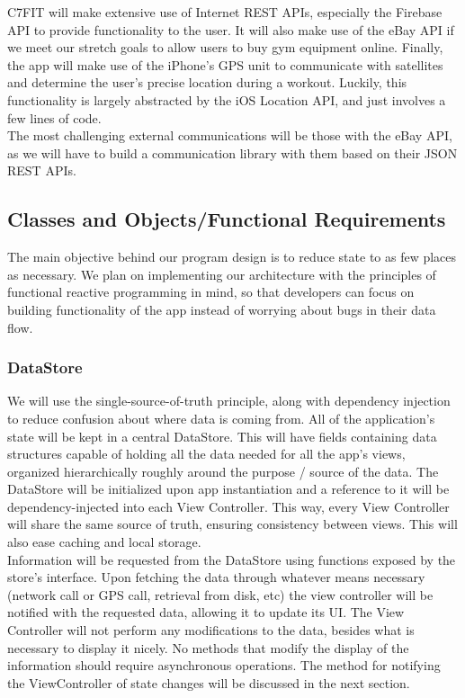 \documentclass[letterpaper,10pt,titlepage]{article}
\begin{document}
C7FIT will make extensive use of Internet REST APIs, especially the Firebase API to provide functionality to the user. It will also make use of the eBay API if we meet our stretch goals to allow users to buy gym equipment online. Finally, the app will make use of the iPhone’s GPS unit to communicate with satellites and determine the user’s precise location during a workout. Luckily, this functionality is largely abstracted by the iOS Location API, and just involves a few lines of code.\\

The most challenging external communications will be those with the eBay API, as we will have to build a communication library with them based on their JSON REST APIs.\\

\subsection{Classes and Objects/Functional Requirements}

The main objective behind our program design is to reduce state to as few places as necessary. We plan on implementing our architecture with the principles of functional reactive programming in mind, so that developers can focus on building functionality of the app instead of worrying about bugs in their data flow.\\

\subsubsection{DataStore}

We will use the single-source-of-truth principle, along with dependency injection to reduce confusion about where data is coming from. All of the application’s state will be kept in a central DataStore. This will have fields containing data structures capable of holding all the data needed for all the app’s views, organized hierarchically roughly around the purpose / source of the data. The DataStore will be initialized upon app instantiation and a reference to it will be dependency-injected into each View Controller. This way, every View Controller will share the same source of truth, ensuring consistency between views. This will also ease caching and local storage.\\

Information will be requested from the DataStore using functions exposed by the store’s interface. Upon fetching the data through whatever means necessary (network call or GPS call, retrieval from disk, etc) the view controller will be notified with the requested data, allowing it to update its UI. The View Controller will not perform any modifications to the data, besides what is necessary to display it nicely. No methods that modify the display of the information should require asynchronous operations. The method for notifying the ViewController of state changes will be discussed in the next section.
\end{document}
